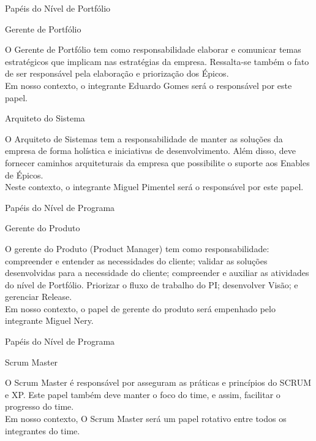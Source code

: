 {\large{Papéis do Nível de Portfólio\\}}

{
	\large{Gerente de Portfólio\\}

	\tab O Gerente de Portfólio tem como responsabilidade elaborar e comunicar temas estratégicos que implicam nas estratégias da empresa. Ressalta-se também o fato de ser responsável pela elaboração e priorização dos Épicos. \\
	\tab Em nosso contexto, o integrante Eduardo Gomes será o responsável por este papel. \\
}


{
	\large{Arquiteto do Sistema\\}

	\tab O Arquiteto de Sistemas tem a responsabilidade de manter as soluções da empresa de forma holística e iniciativas de desenvolvimento. Além disso, deve fornecer caminhos arquiteturais da empresa que possibilite o suporte aos Enables de Épicos. \\
	\tab Neste contexto, o integrante Miguel Pimentel será o responsável por este papel. \\
}

{\large{Papéis do Nível de Programa\\}}

{
	\large{Gerente do Produto\\}

	\tab O gerente do Produto (Product Manager)  tem como responsabilidade: compreender e entender as necessidades do cliente; validar as soluções desenvolvidas para a necessidade do cliente;  compreender e auxiliar as atividades do nível de Portfólio. Priorizar o fluxo de trabalho do PI; desenvolver Visão; e gerenciar Release. \\
	\tab Em nosso contexto, o papel de gerente do produto será empenhado pelo integrante Miguel Nery. \\
 }


{\large{Papéis do Nível de Programa\\}}

{
	\large{Scrum Master\\}

	\tab O Scrum Master é responsável por asseguram as práticas e princípios do SCRUM e XP. Este papel também deve manter o foco do time, e assim, facilitar o progresso do time. \\
	\tab Em nosso contexto, O Scrum Master será um papel rotativo entre todos os integrantes do time. \\
}


